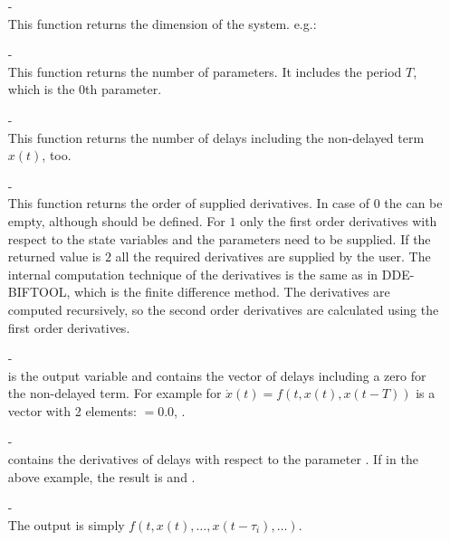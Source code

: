 \documentclass[10pt,a4paper]{ddedoc}
\begin{document}
\begin{itemize}
  \item[-]  \\ 
  This function returns the dimension of the
  system. e.g.: 
  
  \item[-]  \\ 
  This function returns the number of parameters. It
  includes the period $T$, which is the 0th parameter.
  
  \item[-]  \\ 
  This function returns the number of delays including the non-delayed term $x ( t )$, too.
  
  \item[-]  \\ 
  This function returns the order of supplied derivatives. In case of $0$ the  can be empty, although should be defined. For $1$ only the first order derivatives with respect to the state variables and the parameters need to be supplied. If the returned value is $2$ all the required derivatives are supplied by the user. The internal computation technique of the derivatives is the same as in DDE-BIFTOOL, which is the finite difference method. The derivatives are computed recursively, so the second order derivatives are calculated using the first order derivatives.
  
  \item[-]  \\
   is the output variable and contains the vector of delays
  including a zero for the non-delayed term. For example for $\dot{x} ( t ) =
  f ( t, x ( t ), x ( t - T ) )$  is a vector with 2 elements:
  $=0.0$, .
  
  \item[-]  \\
   contains the derivatives of delays with respect to the parameter
  . If  in the above example, the result is
   and .
  
  \item[-]  \\ 
  The output  is simply $f ( t, x ( t ), \ldots, x ( t - \tau_i ), \ldots )$.
  

\end{itemize}
\end{document}
